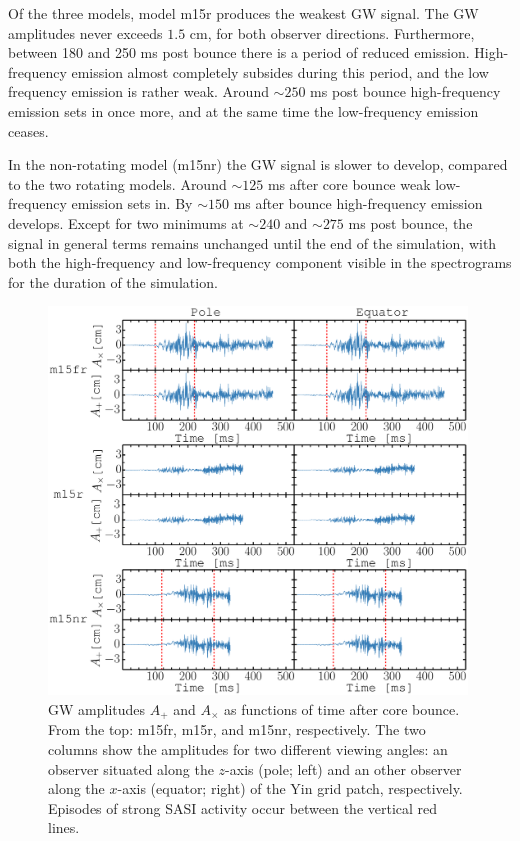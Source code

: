 Of the three models, model m15r produces the weakest GW signal. The GW amplitudes
never exceeds $1.5$ cm, for both observer directions. Furthermore, between 180 and 250 ms post bounce there
is a period of reduced emission. High-frequency emission almost completely subsides during this period,
and the low frequency emission is rather weak. Around $\sim 250$ ms post bounce high-frequency emission 
sets in once more, and at the same time the low-frequency emission ceases. 

In the non-rotating model (m15nr) the GW signal is slower to develop, compared to the two rotating models.
Around $\sim 125$ ms after core bounce weak low-frequency emission sets in. By $\sim 150$ ms after bounce
high-frequency emission develops. Except for two minimums at $\sim 240$ and $\sim 275$ ms post bounce, the
signal in general terms remains unchanged until the end of the simulation, with both the high-frequency
and low-frequency component visible in the spectrograms for the duration of the simulation.

\begin{figure}           
\centering                            
\includegraphics[width=0.99\textwidth]{./images/paper2/amps.pdf}
\caption{GW amplitudes $A_+$ and $A_\times$ as functions of time after core bounce.
  From the top: m15fr, m15r, and m15nr, respectively. 
  The two columns show the amplitudes for two different viewing angles: an observer
  situated along the $z$-axis (pole; left) and an other observer along the $x$-axis (equator; right) of the Yin grid patch, respectively.
  Episodes of strong SASI activity occur between the vertical red lines.  \label{figp2:amps}}
\end{figure}


